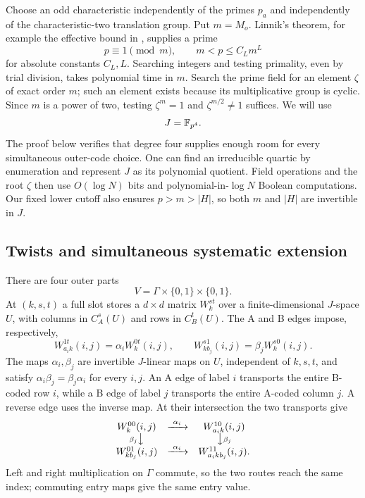 Choose an odd characteristic independently of the primes $p_a$
and independently of the characteristic-two translation group.  Put
$m=M_o$.  Linnik's theorem, for example the effective bound in
\cite[Theorem~1.1]{Xylouris2011}, supplies a prime
\begin{equation}\label{oc:prime}
 p\equiv1\pmod m,\qquad m<p\le C_Lm^{L}
\end{equation}
for absolute constants $C_L,L$.  Searching integers and testing
primality, even by trial division, takes polynomial time in $m$.
Search the prime field for an element $\zeta$ of exact order $m$;
such an element exists because its multiplicative group is cyclic.
Since $m$ is a power of two, testing $\zeta^m=1$ and
$\zeta^{m/2}\ne1$ suffices.  We will use
\begin{equation}\label{oc:field}
 J=\mathbb{F}_{p^4}.
\end{equation}
The proof below verifies that degree four supplies enough room for
every simultaneous outer-code choice.  One can find an irreducible
quartic by enumeration and represent $J$ as its polynomial quotient.
Field operations and the root $\zeta$ then use $O(\log N)$ bits and
polynomial-in-$\log N$ Boolean computations.  Our fixed lower cutoff
also ensures $p>m>|H|$, so both $m$ and $|H|$ are invertible in $J$.

\subsection{Twists and simultaneous systematic extension}
\label{oc:encoders-subsec}

There are four outer parts
\[
 V=\Gamma\times\{0,1\}\times\{0,1\}.
\]
At $(k,s,t)$ a full slot stores a $d\times d$ matrix $W_k^{st}$ over
a finite-dimensional $J$-space $U$, with columns in $C_A^s(U)$ and
rows in $C_B^t(U)$.  The A and B edges impose, respectively,
\begin{equation}\label{oc:edge-equations}
 W_{a_ik}^{1t}(i,j)=\alpha_i W_k^{0t}(i,j),
 \qquad
 W_{kb_j}^{s1}(i,j)=\beta_j W_k^{s0}(i,j).
\end{equation}
The maps $\alpha_i,\beta_j$ are invertible $J$-linear maps on $U$,
independent of $k,s,t$, and satisfy
$\alpha_i\beta_j=\beta_j\alpha_i$ for every $i,j$.  An A edge of
label $i$ transports the entire B-coded row $i$, while a B edge of
label $j$ transports the entire A-coded column $j$.  A reverse edge
uses the inverse map.  At their intersection the two transports give
\[
\begin{array}{ccc}
 W_k^{00}(i,j)&\xrightarrow{\ \alpha_i\ }&W_{a_i k}^{10}(i,j)\\
 {\scriptstyle\beta_j}\big\downarrow&&
       \big\downarrow{\scriptstyle\beta_j}\\
 W_{k b_j}^{01}(i,j)&\xrightarrow{\ \alpha_i\ }&W_{a_i k b_j}^{11}(i,j).
\end{array}
\]
Left and right multiplication on $\Gamma$ commute, so the two routes
reach the same index; commuting entry maps give the same entry value.

